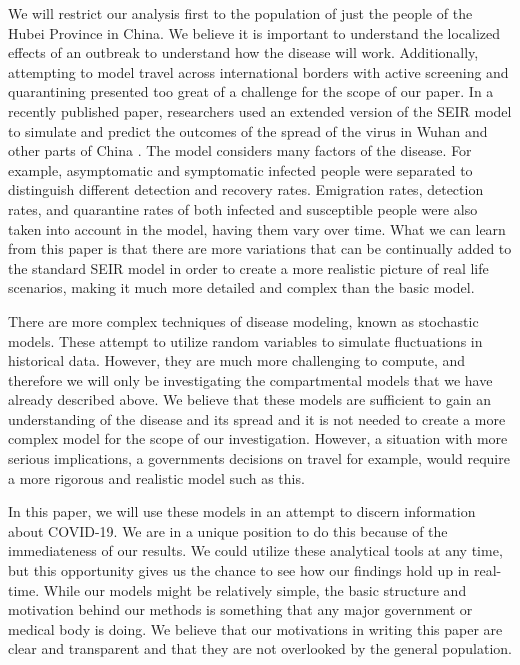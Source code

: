 \documentclass[12pt, a4paper]{article}
\begin{document}
 We will restrict our analysis first to the population of just the people of the Hubei Province in China. We believe it is important to understand the localized effects of an outbreak to understand how the disease will work. Additionally, attempting to model travel across international borders with active screening and quarantining presented too great of a challenge for the scope of our paper. In a recently published paper, researchers used an extended version of the SEIR model to simulate and predict the outcomes of the spread of the virus in Wuhan and other parts of China \cite{control}. The model considers many factors of the disease. For example, asymptomatic and symptomatic infected people were separated to distinguish different detection and recovery rates. Emigration rates, detection rates, and quarantine rates of both infected and susceptible people were also taken into account in the model, having them vary over time. What we can learn from this paper is that there are more variations that can be continually added to the standard SEIR model in order to create a more realistic picture of real life scenarios, making it much more detailed and complex than the basic model.

There are more complex techniques of disease modeling, known as stochastic models. These attempt to utilize random variables to simulate fluctuations in historical data. However, they are much more challenging to compute, and therefore we will only be investigating the compartmental models that we have already described above. We believe that these models are sufficient to gain an understanding of the disease and its spread and it is not needed to create a more complex model for the scope of our investigation. However, a situation with more serious implications, a governments decisions on travel for example, would require a more rigorous and realistic model such as this.

In this paper, we will use these models in an attempt to discern information about COVID-19. We are in a unique position to do this because of the immediateness of our results. We could utilize these analytical tools at any time, but this opportunity gives us the chance to see how our findings hold up in real-time. While our models might be relatively simple, the basic structure and motivation behind our methods is something that any major government or medical body is doing. We believe that our motivations in writing this paper are clear and transparent and that they are not overlooked by the general population.
\end{document}
